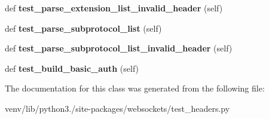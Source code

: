 \begin{DoxyCompactItemize}
def {\bfseries test\+\_\+parse\+\_\+extension\+\_\+list\+\_\+invalid\+\_\+header} (self)
\item 
\mbox{\label{classwebsockets_1_1test__headers_1_1_headers_tests_a87893e54aaa03c2eeb7a1699c3673365}} 
def {\bfseries test\+\_\+parse\+\_\+subprotocol\+\_\+list} (self)
\item 
\mbox{\label{classwebsockets_1_1test__headers_1_1_headers_tests_ae83e550b228d3c8daab2401ed96a8b6d}} 
def {\bfseries test\+\_\+parse\+\_\+subprotocol\+\_\+list\+\_\+invalid\+\_\+header} (self)
\item 
\mbox{\label{classwebsockets_1_1test__headers_1_1_headers_tests_a0c17ac6bd61e0431c58b385be4c63438}} 
def {\bfseries test\+\_\+build\+\_\+basic\+\_\+auth} (self)
\end{DoxyCompactItemize}


The documentation for this class was generated from the following file\+:\begin{DoxyCompactItemize}
\item 
venv/lib/python3./site-\/packages/websockets/test\+\_\+headers.\+py\end{DoxyCompactItemize}
